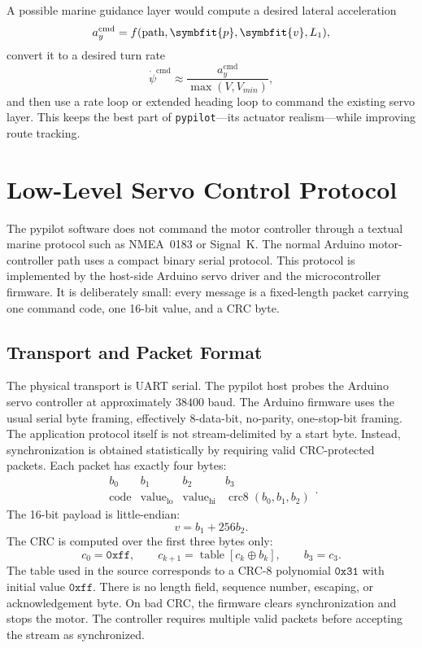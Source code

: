 \documentclass[10pt,twocolumn]{article}
\newcommand{\vct}[1]{\symbfit{#1}}   %
\newcommand{\heading}{\psi}
\newcommand{\cmd}{\mathrm{cmd}}
\begin{document}
A possible marine guidance layer would compute a desired lateral acceleration
\begin{equation}
  a_y^{\cmd} = f(\text{path}, \vct{p}, \vct{v}, L_1),
\end{equation}
convert it to a desired turn rate
\begin{equation}
  \dot{\heading}^{\cmd} \approx \frac{a_y^{\cmd}}{\max(V, V_{min})},
\end{equation}
and then use a rate loop or extended heading loop to command the existing servo layer.
This keeps the best part of \texttt{pypilot}---its actuator realism---while improving
route tracking.

\section{Low-Level Servo Control Protocol}
\label{sec:servo-protocol}
The pypilot software does not command the motor controller through a
textual marine protocol such as NMEA~0183 or Signal~K.  The normal
Arduino motor-controller path uses a compact binary serial protocol.
This protocol is implemented by the host-side Arduino servo driver and
the microcontroller firmware.  It is deliberately small: every message is
a fixed-length packet carrying one command code, one 16-bit value, and a
CRC byte.
\subsection{Transport and Packet Format}
The physical transport is UART serial.  The pypilot host probes the
Arduino servo controller at approximately \(38400\) baud.  The Arduino
firmware uses the usual serial byte framing, effectively \(8\)-data-bit,
no-parity, one-stop-bit framing.  The application protocol itself is not
stream-delimited by a start byte.  Instead, synchronization is obtained
statistically by requiring valid CRC-protected packets.
Each packet has exactly four bytes:
\[
\begin{array}{c|c|c|c}
b_0 & b_1 & b_2 & b_3 \\
\hline
\text{code} & \text{value}_{\mathrm{lo}} &
\text{value}_{\mathrm{hi}} & \operatorname{crc8}(b_0,b_1,b_2)
\end{array}.
\]
The 16-bit payload is little-endian:
\[
v = b_1 + 256 b_2.
\]
The CRC is computed over the first three bytes only:
\[
c_0 = \mathtt{0xff},
\qquad
c_{k+1} =
\operatorname{table}\!\left[c_k \oplus b_k\right],
\qquad
b_3 = c_3 .
\]
The table used in the source corresponds to a CRC-8 polynomial
\(\mathtt{0x31}\) with initial value \(\mathtt{0xff}\).  There is no
length field, sequence number, escaping, or acknowledgement byte.  On bad
CRC, the firmware clears synchronization and stops the motor.  The
controller requires multiple valid packets before accepting the stream as
synchronized.
\end{document}
